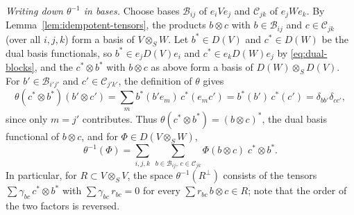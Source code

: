 \begin{supplementary}
\emph{Writing down $\theta^{-1}$ in bases.}
Choose bases $\mathcal B_{ij}$ of $e_iVe_j$ and $\mathcal C_{jk}$ of $e_jWe_k$.
By Lemma~\ref{lem:idempotent-tensors}, the products $b\otimes c$ with $b\in\mathcal B_{ij}$ and $c\in\mathcal C_{jk}$ (over all $i,j,k$) form a basis of $V\otimes_SW$.
Let $b^*\in D(V)$ and $c^*\in D(W)$ be the dual basis functionals, so $b^*\in e_jD(V)e_i$ and $c^*\in e_kD(W)e_j$ by \eqref{eq:dual-blocks}, and the $c^*\otimes b^*$ with $b\otimes c$ as above form a basis of $D(W)\otimes_SD(V)$.
For $b'\in\mathcal B_{i'j'}$ and $c'\in\mathcal C_{j'k'}$, the definition of $\theta$ gives
\[
\theta(c^*\otimes b^*)(b'\otimes c')=\sum_m b^*(b'e_m)\,c^*(e_mc')=b^*(b')\,c^*(c')=\delta_{bb'}\delta_{cc'},
\]
since only $m=j'$ contributes.
Thus $\theta(c^*\otimes b^*)=(b\otimes c)^*$, the dual basis functional of $b\otimes c$, and for $\Phi\in D(V\otimes_SW)$,
\[
\theta^{-1}(\Phi)=\sum_{i,j,k}\ \sum_{b\in\mathcal B_{ij},\,c\in\mathcal C_{jk}}\Phi(b\otimes c)\;c^*\otimes b^*.
\]
In particular, for $R\subset V\otimes_SV$, the space $\theta^{-1}(R^\perp)$ consists of the tensors $\sum\gamma_{bc}\,c^*\otimes b^*$ with $\sum\gamma_{bc}\,r_{bc}=0$ for every $\sum r_{bc}\,b\otimes c\in R$; note that the order of the two factors is reversed.
\end{supplementary}


